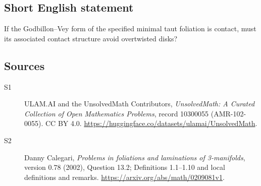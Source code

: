 \documentclass[11pt]{article}
\begin{document}
\subsection{Short English statement}
If the Godbillon--Vey form of the specified minimal taut foliation is contact, must its associated contact structure avoid overtwisted disks?
\subsection{Sources}
\begin{description}
\item[\hypertarget{source:10300055:1}{S1}] ULAM.AI and the UnsolvedMath Contributors, \emph{UnsolvedMath: A Curated Collection of Open Mathematics Problems}, record 10300055 (AMR-102-0055). CC BY 4.0. \url{https://huggingface.co/datasets/ulamai/UnsolvedMath}.
\item[\hypertarget{source:10300055:2}{S2}] Danny Calegari, \emph{Problems in foliations and laminations of 3-manifolds}, version 0.78 (2002), Question 13.2; Definitions 1.1--1.10 and local definitions and remarks. \url{https://arxiv.org/abs/math/0209081v1}.
\end{description}
\label{end:10300055}
\end{document}
